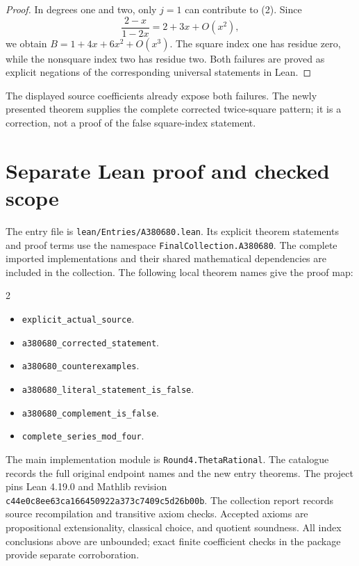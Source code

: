 \documentclass[11pt,a4paper]{article}
\theoremstyle{remark}
\begin{document}
\begin{proof}
In degrees one and two, only $j=1$ can contribute to (2). Since
\[
 \frac{2-x}{1-2x}=2+3x+O(x^2),
\]
we obtain $B=1+4x+6x^2+O(x^3)$. The square index one has residue zero,
while the nonsquare index two has residue two. Both failures are proved
as explicit negations of the corresponding universal statements in Lean.
\end{proof}


The displayed source coefficients already expose both failures. The
newly presented theorem supplies the complete corrected twice-square pattern;
it is a correction, not a proof of the false square-index statement.

\section{Separate Lean proof and checked scope}

The entry file is \nolinkurl{lean/Entries/A380680.lean}. Its explicit
theorem statements and proof terms use the namespace
\nolinkurl{FinalCollection.A380680}. The complete imported implementations
and their shared mathematical dependencies are included in the collection.
The following local theorem names give the proof map:

\begin{multicols}{2}\raggedright\begin{itemize}\setlength{\itemsep}{2pt}\setlength{\parsep}{0pt}
\item \nolinkurl{explicit_actual_source}.
\item \nolinkurl{a380680_corrected_statement}.
\item \nolinkurl{a380680_counterexamples}.
\item \nolinkurl{a380680_literal_statement_is_false}.
\item \nolinkurl{a380680_complement_is_false}.
\item \nolinkurl{complete_series_mod_four}.
\end{itemize}\end{multicols}

The main implementation module is \nolinkurl{Round4.ThetaRational}.
The catalogue records the full original endpoint names and the new entry
theorems. The project pins Lean 4.19.0 and Mathlib revision
\nolinkurl{c44e0c8ee63ca166450922a373c7409c5d26b00b}. The collection
report records source recompilation and transitive axiom checks. Accepted
axioms are propositional extensionality, classical choice, and quotient
soundness. All index conclusions above are unbounded; exact finite
coefficient checks in the package provide separate corroboration.
\end{document}
